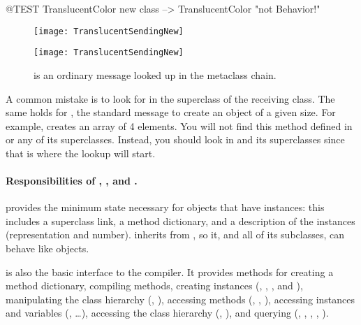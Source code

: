 \documentclass[a4paper,10pt,twoside]{book}
\begin{document}
\begin{code}{@TEST}
TranslucentColor new class --> TranslucentColor    "not Behavior!"
\end{code}

\begin{center}
\begin{figure}
\ifluluelse
	{\centerline{\texttt{[image: TranslucentSendingNew]}}}
	{\centerline{\texttt{[image: TranslucentSendingNew]}}}
\caption{ is an ordinary message looked up in the metaclass chain.\label{fig:sendingnew}}
\end{figure}
\end{center}

A common mistake is to look for  in the superclass of the receiving class.
The same holds for , the standard message to create an object of a given size.
For example,  creates an array of 4 elements.
You will not find this method defined in  or any of its superclasses.
Instead, you should look in  and its superclasses since that is where the lookup will start.


\paragraph{Responsibilities of , , and .}
 provides the minimum state necessary for objects that have instances: this includes a superclass link, a method dictionary, and a description of the instances (\ie representation and number).
 inherits from , so it, and all of its subclasses, can behave like objects. 

 is also the basic interface to the compiler.
It provides methods for creating a method dictionary,
compiling methods,
creating instances (\ie {}, , , and ),
manipulating the class hierarchy (\ie {}, ),
accessing methods (\ie {}, , ),
accessing instances and variables (\ie {}, \ldots),
accessing the class hierarchy (\ie {}, ), and
querying (\ie {}, , , , ).
\end{document}
